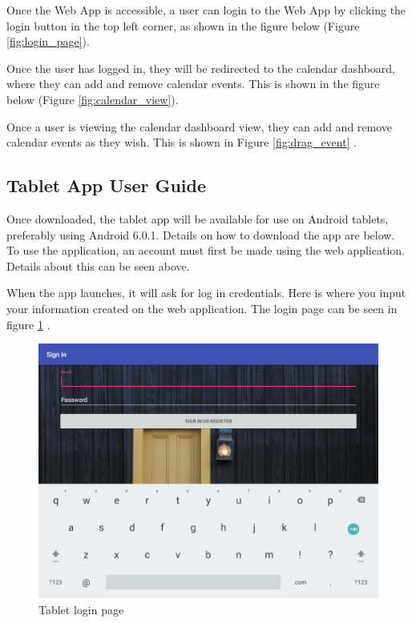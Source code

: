 Once the Web App is accessible, a user can login to the Web App by clicking the login button in the top left corner, as shown in the figure below (Figure \ref{fig:login_page}).

Once the user has logged in, they will be redirected to the calendar dashboard, where they can add and remove calendar events. This is shown in the figure below (Figure \ref{fig:calendar_view}).


Once a user is viewing the calendar dashboard view, they can add and remove calendar events as they wish. This is shown in Figure \ref{fig:drag_event} .



\subsection{Tablet App User Guide}
Once downloaded, the tablet app will be available for use on Android tablets, preferably using Android 6.0.1.  Details on how to download the app are below.  To use the application, an account must first be made using the web application.  Details about this can be seen above.  

When the app launches, it will ask for log in credentials. Here is where you input your information created on the web application.  The login page can be seen in figure \ref{login} .

\begin{figure}
\centering
  \includegraphics[scale=0.3]{login_final.png}
  \caption{Tablet login page}
  \label{login}
\end{figure}

